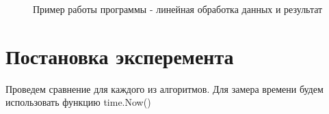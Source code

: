 \documentclass[12pt]{report}
\begin{document}
\begin{figure}[H]
	\caption{Пример работы программы - линейная обработка данных и результат}
	\label{ris:example_lin}
\end{figure}

\section{Постановка эксперемента}
Проведем сравнение для каждого из алгоритмов. Для замера времени будем использовать функцию time.Now()
\end{document}
